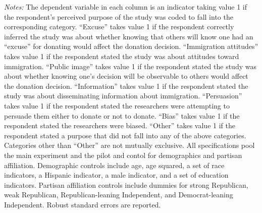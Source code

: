 \begin{table}[!htbp]
\begin{threeparttable}
\begin{tablenotes}
\item \textit{Notes:} The dependent variable in each column is an indicator taking value 1 if  the respondent's perceived purpose of the study was coded to fall into the corresponding category. ``Excuse'' takes value 1 if the respondent correctly inferred the study was about whether knowing that others will know one had an ``excuse'' for donating would affect the donation decision. ``Immigration attitudes'' takes value 1 if the respondent stated the study was about attitudes toward immigration. ``Public image'' takes value 1 if the respondent stated the study was about whether knowing one's decision will be observable to others would affect the donation decision. ``Information'' takes value 1 if the respondent stated the study was about disseminating information about immigration. ``Persuasion'' takes value 1 if the respondent stated the researchers were attempting to persuade them either to donate or not to donate. ``Bias'' takes value 1 if the respondent stated the researchers were biased. ``Other'' takes value 1 if the respondent stated a purpose that did not fall into any of the above categories. Categories other than ``Other'' are not mutually exclusive. All specifications pool the main experiment and the pilot and contol for demographics and partisan affiliation. Demographic controls include age, age squared, a set of race indicators, a Hispanic indicator, a male indicator, and a set of education indicators. Partisan affiliation controls include dummies for strong Republican, weak Republican, Republican-leaning Independent, and Democrat-leaning Independent. Robust standard errors are reported.
\end{tablenotes}
\end{threeparttable}
\end{table} 
